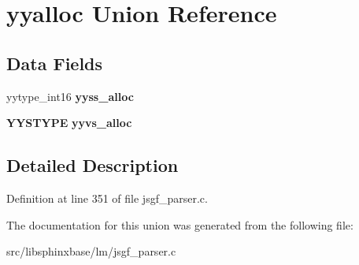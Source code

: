 \section{yyalloc Union Reference}
\label{unionyyalloc}
\subsection*{Data Fields}
\begin{DoxyCompactItemize}
\item 
yytype\-\_\-int16 {\bfseries yyss\-\_\-alloc}\label{unionyyalloc_a4800e0520a89a4789afa7b5d82197e65}

\item 
{\bf Y\-Y\-S\-T\-Y\-P\-E} {\bfseries yyvs\-\_\-alloc}\label{unionyyalloc_a9326f4fdc6f737a929444427836d8928}

\end{DoxyCompactItemize}


\subsection{Detailed Description}


Definition at line 351 of file jsgf\-\_\-parser.\-c.



The documentation for this union was generated from the following file\-:\begin{DoxyCompactItemize}
\item 
src/libsphinxbase/lm/jsgf\-\_\-parser.\-c\end{DoxyCompactItemize}
